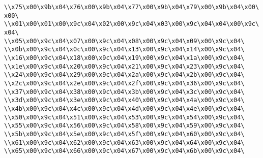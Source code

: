 \verb|\\x75\x00\x9b\x04\x76\x00\x9b\x04\x77\x00\x9b\x04\x79\x00\x9b\x04\x00\x00\|\newline
\verb|\\x01\x00\x01\x00\x9c\x04\x02\x00\x9c\x04\x03\x00\x9c\x04\x04\x00\x9c\x04\|\newline
\verb|\\x05\x00\x9c\x04\x07\x00\x9c\x04\x08\x00\x9c\x04\x09\x00\x9c\x04\|\newline
\verb|\\x0b\x00\x9c\x04\x0c\x00\x9c\x04\x13\x00\x9c\x04\x14\x00\x9c\x04\|\newline
\verb|\\x16\x00\x9c\x04\x18\x00\x9c\x04\x19\x00\x9c\x04\x1a\x00\x9c\x04\|\newline
\verb|\\x1e\x00\x9c\x04\x20\x00\x9c\x04\x21\x00\x9c\x04\x23\x00\x9c\x04\|\newline
\verb|\\x24\x00\x9c\x04\x29\x00\x9c\x04\x2a\x00\x9c\x04\x2b\x00\x9c\x04\|\newline
\verb|\\x2c\x00\x9c\x04\x2e\x00\x9c\x04\x2f\x00\x9c\x04\x36\x00\x9c\x04\|\newline
\verb|\\x37\x00\x9c\x04\x38\x00\x9c\x04\x3b\x00\x9c\x04\x3c\x00\x9c\x04\|\newline
\verb|\\x3d\x00\x9c\x04\x3e\x00\x9c\x04\x40\x00\x9c\x04\x4a\x00\x9c\x04\|\newline
\verb|\\x4b\x00\x9c\x04\x4c\x00\x9c\x04\x4d\x00\x9c\x04\x4e\x00\x9c\x04\|\newline
\verb|\\x50\x00\x9c\x04\x51\x00\x9c\x04\x53\x00\x9c\x04\x54\x00\x9c\x04\|\newline
\verb|\\x55\x00\x9c\x04\x56\x00\x9c\x04\x58\x00\x9c\x04\x59\x00\x9c\x04\|\newline
\verb|\\x5b\x00\x9c\x04\x5e\x00\x9c\x04\x5f\x00\x9c\x04\x60\x00\x9c\x04\|\newline
\verb|\\x61\x00\x9c\x04\x62\x00\x9c\x04\x63\x00\x9c\x04\x64\x00\x9c\x04\|\newline
\verb|\\x65\x00\x9c\x04\x66\x00\x9c\x04\x67\x00\x9c\x04\x6b\x00\x9c\x04\|\newline
